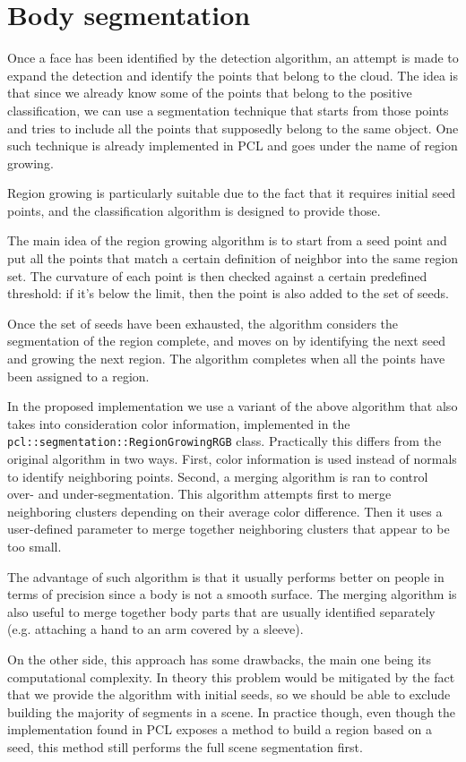\documentclass[a4paper,11pt,titlepage]{article}
\begin{document}
\section{Body segmentation}
Once a face has been identified by the detection algorithm, an attempt is made
to expand the detection and identify the points that belong to the cloud. The
idea is that since we already know some of the points that belong to the
positive classification, we can use a segmentation technique that starts from
those points and tries to include all the points that supposedly belong to the
same object. One such technique is already implemented in PCL and goes under
the name of region growing.

Region growing is particularly suitable due to the fact that it requires initial
seed points, and the classification algorithm is designed to provide those.

The main idea of the region growing algorithm is to start from a seed point and
put all the points that match a certain definition of neighbor into the same
region set. The curvature of each point is then checked against a certain
predefined threshold: if it's below the limit, then the point is also added to
the set of seeds.

Once the set of seeds have been exhausted, the algorithm considers the
segmentation of the region complete, and moves on by identifying the next seed
and growing the next region. The algorithm completes when all the points have
been assigned to a region.

In the proposed implementation we use a variant of the above algorithm that
also takes into consideration color information, implemented in the
\texttt{pcl::segmentation::RegionGrowingRGB} class. Practically this differs
from the original algorithm in two ways. First, color information is used
instead of normals to identify neighboring points. Second, a merging algorithm
is ran to control over- and under-segmentation. This algorithm attempts first to
merge neighboring clusters depending on their average color difference. Then it
uses a user-defined parameter to merge together neighboring clusters that appear
to be too small.

The advantage of such algorithm is that it usually performs better on people in
terms of precision since a body is not a smooth surface. The merging algorithm
is also useful to merge together body parts that are usually identified
separately (e.g. attaching a hand to an arm covered by a sleeve).

On the other side, this approach has some drawbacks, the main one being its
computational complexity. In theory this problem would be mitigated by the fact
that we provide the algorithm with initial seeds, so we should be able to
exclude building the majority of segments in a scene. In practice though, even
though the implementation found in PCL exposes a method to build a region based
on a seed, this method still performs the full scene segmentation first.
\end{document}
